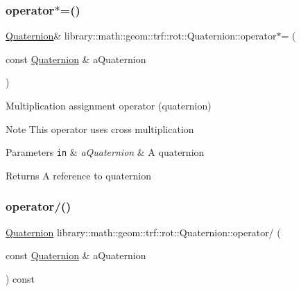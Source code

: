 \subsubsection{\texorpdfstring{operator$\ast$=()}{operator*=()}}
{\footnotesize\ttfamily \hyperlink{classlibrary_1_1math_1_1geom_1_1trf_1_1rot_1_1_quaternion}{Quaternion}\& library\+::math\+::geom\+::trf\+::rot\+::\+Quaternion\+::operator$\ast$= (\begin{DoxyParamCaption}\item[{const \hyperlink{classlibrary_1_1math_1_1geom_1_1trf_1_1rot_1_1_quaternion}{Quaternion} \&}]{a\+Quaternion }\end{DoxyParamCaption})}



Multiplication assignment operator (quaternion) 

\begin{DoxyNote}{Note}
This operator uses cross multiplication
\end{DoxyNote}

\begin{DoxyParams}[1]{Parameters}
\mbox{\tt in}  & {\em a\+Quaternion} & A quaternion \\
\hline
\end{DoxyParams}
\begin{DoxyReturn}{Returns}
A reference to quaternion 
\end{DoxyReturn}
\mbox{\label{classlibrary_1_1math_1_1geom_1_1trf_1_1rot_1_1_quaternion_ac0907a730ef9a96e7c06ce930e86d033}} 
\subsubsection{\texorpdfstring{operator/()}{operator/()}}
{\footnotesize\ttfamily \hyperlink{classlibrary_1_1math_1_1geom_1_1trf_1_1rot_1_1_quaternion}{Quaternion} library\+::math\+::geom\+::trf\+::rot\+::\+Quaternion\+::operator/ (\begin{DoxyParamCaption}\item[{const \hyperlink{classlibrary_1_1math_1_1geom_1_1trf_1_1rot_1_1_quaternion}{Quaternion} \&}]{a\+Quaternion }\end{DoxyParamCaption}) const}



